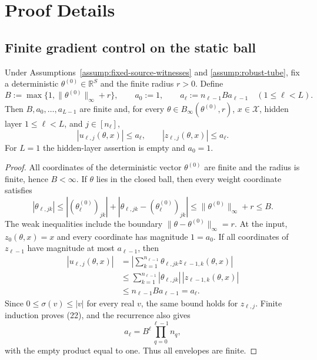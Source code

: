 \appendix

\section{Proof Details}
\label{sec:proof-details}

\subsection{Finite gradient control on the static ball}
\label{app:step001-gradient}

\begin{lemma}
\label{lem:p1-i3-step001-forward}
Under Assumptions~\ref{assump:fixed-source-witnesses} and
\ref{assump:robust-tube}, fix a deterministic
$\theta^{(0)}\in\mathbb R^S$ and the finite radius $r>0$.  Define
\[
B:=\max\{1,\|\theta^{(0)}\|_\infty+r\},
\qquad a_0:=1,
\qquad a_\ell:=n_{\ell-1}B a_{\ell-1}
\quad(1\leq\ell<L).
\tag{21}
\]
Then $B,a_0,\ldots,a_{L-1}$ are finite and, for every
$\theta\in B_\infty(\theta^{(0)},r)$, $x\in\mathcal X$, hidden layer
$1\leq\ell<L$, and $j\in[n_\ell]$,
\[
|u_{\ell,j}(\theta,x)|\leq a_\ell,
\qquad
|z_{\ell,j}(\theta,x)|\leq a_\ell.
\tag{22}
\]
For $L=1$ the hidden-layer assertion is empty and $a_0=1$.
\end{lemma}

\begin{proof}
All coordinates of the deterministic vector $\theta^{(0)}$ are finite and
the radius is finite, hence $B<\infty$.  If $\theta$ lies in the closed ball,
then every weight coordinate satisfies
\[
|\theta_{\ell,jk}|
\leq |(\theta^{(0)}_\ell)_{jk}|
      +|\theta_{\ell,jk}-(\theta^{(0)}_\ell)_{jk}|
\leq \|\theta^{(0)}\|_\infty+r\leq B.
\tag{23}
\]
The weak inequalities include the boundary $\|\theta-\theta^{(0)}\|_\infty=r$.
At the input, $z_0(\theta,x)=x$ and every coordinate has magnitude
$1=a_0$.  If all coordinates of $z_{\ell-1}$ have magnitude at most
$a_{\ell-1}$, then
\[
\begin{aligned}
|u_{\ell,j}(\theta,x)|
&=\left|\sum_{k=1}^{n_{\ell-1}}
       \theta_{\ell,jk}z_{\ell-1,k}(\theta,x)\right|\\
&\leq\sum_{k=1}^{n_{\ell-1}}
       |\theta_{\ell,jk}|\,|z_{\ell-1,k}(\theta,x)|\\
&\leq n_{\ell-1}B a_{\ell-1}=a_\ell.
\end{aligned}
\tag{24}
\]
Since $0\leq\sigma(v)\leq|v|$ for every real $v$, the same bound holds
for $z_{\ell,j}$.  Finite induction proves (22), and the recurrence also
gives
\[
a_\ell=B^\ell\prod_{q=0}^{\ell-1}n_q,
\tag{25}
\]
with the empty product equal to one.  Thus all envelopes are finite.
\end{proof}

